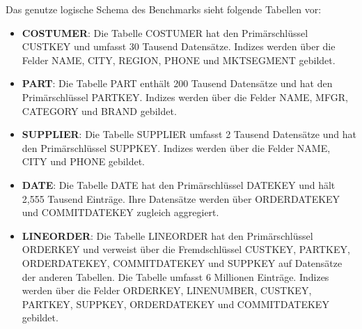 Das genutze logische Schema des Benchmarks sieht folgende Tabellen vor: 
\begin{itemize}
	\item \textbf{{\glqq}COSTUMER{\grqq}}: Die Tabelle {\glqq}COSTUMER{\grqq} hat den Primärschlüssel {\glqq}CUSTKEY{\grqq} und umfasst 30 Tausend Datensätze. Indizes werden über die Felder {\glqq}NAME{\grqq}, {\glqq}CITY{\grqq}, {\glqq}REGION{\grqq}, {\glqq}PHONE{\grqq} und {\glqq}MKTSEGMENT{\grqq} gebildet. 
	\item \textbf{{\glqq}PART{\grqq}}: Die Tabelle {\glqq}PART{\grqq} enthält 200 Tausend Datensätze und hat den Primärschlüssel {\glqq}PARTKEY{\grqq}. Indizes werden über die Felder {\glqq}NAME{\grqq}, {\glqq}MFGR{\grqq}, {\glqq}CATEGORY{\grqq} und {\glqq}BRAND{\grqq} gebildet. 
	\item \textbf{{\glqq}SUPPLIER{\grqq}}: Die Tabelle {\glqq}SUPPLIER{\grqq} umfasst 2 Tausend Datensätze und hat den Primärschlüssel {\glqq}SUPPKEY{\grqq}. Indizes werden über die Felder {\glqq}NAME{\grqq}, {\glqq}CITY{\grqq} und {\glqq}PHONE{\grqq} gebildet. 
	\item \textbf{{\glqq}DATE{\grqq}}: Die Tabelle {\glqq}DATE{\grqq} hat den Primärschlüssel {\glqq}DATEKEY{\grqq} und hält 2,555 Tausend Einträge. Ihre Datensätze werden über {\glqq}ORDERDATEKEY{\grqq} und {\glqq}COMMITDATEKEY{\grqq} zugleich aggregiert. 
	\item \textbf{{\glqq}LINEORDER{\grqq}}: Die Tabelle {\glqq}LINEORDER{\grqq} hat den Primärschlüssel {\glqq}ORDERKEY{\grqq} und verweist über die Fremdschlüssel {\glqq}CUSTKEY{\grqq}, {\glqq}PARTKEY{\grqq}, {\glqq}ORDERDATEKEY{\grqq}, {\glqq}COMMITDATEKEY{\grqq} und {\glqq}SUPPKEY{\grqq} auf Datensätze der anderen Tabellen. Die Tabelle umfasst 6 Millionen Einträge. Indizes werden über die Felder {\glqq}ORDERKEY, {\glqq}LINENUMBER, {\glqq}CUSTKEY{\grqq}, {\glqq}PARTKEY{\grqq}, {\glqq}SUPPKEY{\grqq}, {\glqq}ORDERDATEKEY{\grqq} und {\glqq}COMMITDATEKEY{\grqq} gebildet. 
\end{itemize}








